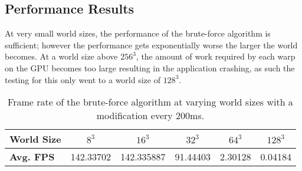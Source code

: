\subsection{Performance Results}
At very small world sizes, the performance of the brute-force algorithm is sufficient; however the performance gets
exponentially worse the larger the world becomes. At a world size above \(256^3\), the amount of work required by each
warp on the GPU becomes too large resulting in the application crashing, as such the testing for this only went to a
world size of \(128^3\).

\begin{table}[h]
    \centering
    \vspace{0.5em}
    \begin{tabular}{l|*{5}{c}}
        \toprule
        \textbf{World Size} & \textbf{\(8^3\)} & \textbf{\(16^3\)} & \textbf{\(32^3\)} & \textbf{\(64^3\)} & \textbf{\(128^3\)} \\
        \midrule
        \textbf{Avg. FPS}   & 142.33702        & 142.335887        & 91.44403          & 2.30128           & 0.04184            \\
        \bottomrule
    \end{tabular}
    \caption{Frame rate of the brute-force algorithm at varying world sizes with a modification every 200ms.}
    \label{tab:brute_force_fps}
\end{table}

\begin{table}[h]
    \centering
    \vspace{0.5em}
    \caption{Distance field compute shader execution time using the brute-force algorithm.}
    \label{tab:brute_force}
\end{table}

